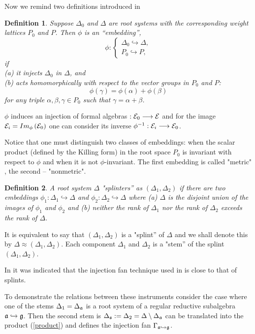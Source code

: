 \documentclass[12pt]{article}
\newtheorem{Def}{Definition}[section]
\begin{document}
Now we remind two definitions introduced in \cite{richter2008splints}
\begin{Def}
Suppose $\Delta_0$ and $\Delta$ are root systems with the corresponding weight lattices $P_0$ and $P$.  Then $\phi$ is an ``embedding'', 
\begin{equation}
\phi:\left\{
\begin{array}{l}
\Delta_0\hookrightarrow\Delta,\\
P_0 \hookrightarrow P,
 \end{array}
\right.
\end{equation}
if \\
\noindent
(a) it injects $\Delta_0$ in $\Delta$, and \\
\noindent
(b) acts homomorphically with respect to the vector groups in $P_0$ and $P$:
$$\phi(\gamma)=\phi(\alpha)+\phi(\beta)$$
for any triple $\alpha,\beta,\gamma\in P_0$ such that $\gamma=\alpha+\beta$.
\end{Def}
$\phi$ induces an injection of formal algebras $ :{\cal{E}}_0 \longrightarrow \cal{E}$ and for the image ${\cal{E}}_i=Im_{\phi}\left( {\cal{E}}_0\right)$ one can consider its inverse
$\phi^{-1}:{\cal{E}}_i \longrightarrow {\cal{E}}_0$. 

 Notice that one must distinguish two classes of embeddings: when the scalar product (defined by the Killing form) in the root space $P_0$ is invariant with respect to $\phi$ and when it is not $\phi$-invariant. The first embedding is called "metric" 
, the second -- "nonmetric". 
\begin{Def}
A root system $\Delta$ "splinters'' as $(\Delta_1,\Delta_2)$ if there are two embeddings
$\phi_1:\Delta_1\hookrightarrow\Delta$ and $\phi_2:\Delta_2\hookrightarrow\Delta$
where (a) $\Delta$ is the disjoint union of the images of $\phi_1$ and $\phi_2$ and
(b) neither the rank of $\Delta_1$ nor the rank of $\Delta_2$ exceeds the rank of $\Delta$.
\end{Def}
It is equivalent to say that $(\Delta_1,\Delta_2)$ is a "splint'' of $\Delta$ and we shall denote this by $\Delta \approx (\Delta_1,\Delta_2)$.
Each component $\Delta_1$ and $\Delta_2$ is a "stem'' of the splint $(\Delta_1,\Delta_2)$.

In \cite{richter2008splints} it was indicated that the injection fan technique used in \cite{lyakhovsky1996rra} is close to that of splints.

To demonstrate the relations between these instruments consider the case where
one of the stems $\Delta_1=\Delta_{\frak{a}}$ is a root system of a regular reductive subalgebra  $\frak{a}\hookrightarrow\frak{g}$. Then the second stem is $\Delta_{\frak{s}}:=\Delta_2=\Delta \setminus \Delta _{\frak{a}}$ can be translated into the product (\ref{product}) and defines the injection fan $\Gamma_{\frak{a}\hookrightarrow\frak{g}}$.
\end{document}
